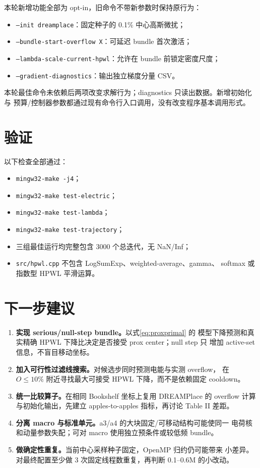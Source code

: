 \documentclass[UTF8,fontset=windows,a4paper,11pt]{ctexart}
\newcommand{\code}[1]{\texttt{#1}}
\begin{document}
本轮新增功能全部为 opt-in，旧命令不带新参数时保持原行为：
\begin{itemize}
  \item \code{--init dreamplace}：固定种子的 0.1\% 中心高斯微扰；
  \item \code{--bundle-start-overflow X}：可延迟 bundle 首次激活；
  \item \code{--lambda-scale-current-hpwl}：允许在 bundle 前锁定密度尺度；
  \item \code{--gradient-diagnostics}：输出独立梯度分量 CSV。
\end{itemize}
本轮最佳命令未依赖后两项改变求解行为；diagnostics 只读出数据。新增初始化与
预算/控制器参数都通过现有命令行入口调用，没有改变程序基本调用形式。

\section{验证}

以下检查全部通过：
\begin{itemize}
  \item \code{mingw32-make -j4}；
  \item \code{mingw32-make test-electric}；
  \item \code{mingw32-make test-lambda}；
  \item \code{mingw32-make test-trajectory}；
  \item 三组最佳运行均完整包含 3000 个总迭代，无 NaN/Inf；
  \item \code{src/hpwl.cpp} 不包含 LogSumExp、weighted-average、gamma、
  softmax 或指数型 HPWL 平滑运算。
\end{itemize}

\section{下一步建议}

\begin{enumerate}
  \item \textbf{实现 serious/null-step bundle。}以式\eqref{eq:proxprimal} 的
  模型下降预测和真实精确 HPWL 下降比决定是否接受 prox center；null step 只
  增加 active-set 信息，不盲目移动坐标。
  \item \textbf{加入可行性过滤线搜索。}对候选步同时预测电能与实测 overflow，
  在 $O\leq10\%$ 附近寻找最大可接受 HPWL 下降，而不是依赖固定 cooldown。
  \item \textbf{统一比较算子。}在相同 Bookshelf 坐标上复用 DREAMPlace 的
  overflow 计算与初始化输出，先建立 apples-to-apples 指标，再讨论 Table II 差距。
  \item \textbf{分离 macro 与标准单元。}a3/a4 的大块固定/可移动结构可能使同一
  电荷核和动量参数失配；可对 macro 使用独立预条件或较低频 bundle。
  \item \textbf{做确定性重复。}当前中心采样种子固定，OpenMP 归约仍可能带来
  小差异。对最终配置至少做 3 次固定线程数重复，再判断 0.1--0.6M 的小改动。
\end{enumerate}
\end{document}
